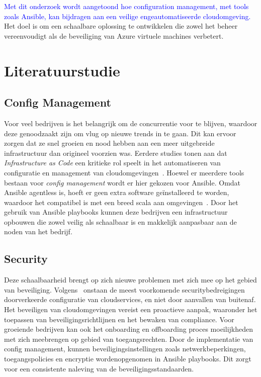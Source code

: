 \textcolor{blue}{Met dit onderzoek wordt aangetoond hoe configuration management, met tools zoals Ansible, kan bijdragen aan een veilige en\linebreak geautomatiseerde cloudomgeving.}
Het doel is om een schaalbare oplossing te ontwikkelen die zowel het beheer vereenvoudigt als de beveiliging van Azure virtuele machines verbetert.


\section{Literatuurstudie}%
\label{sec:literatuurstudie}

\subsection{Config Management}%

Voor veel bedrijven is het belangrijk om de concurrentie voor te blijven, waardoor deze genoodzaakt zijn om vlug op nieuwe trends in te gaan.
Dit kan ervoor zorgen dat ze snel groeien en nood hebben aan een meer uitgebreide infrastructuur dan origineel voorzien was.
Eerdere studies tonen aan dat \emph{Infrastructure as Code} een kritieke rol speelt in het automatiseren van configuratie en management van cloudomgevingen\linebreak~\autocite{Kalliomaa2024}.
Hoewel er meerdere tools bestaan voor \emph{config management} wordt er hier gekozen voor Ansible.
Omdat Ansible agentless is, hoeft er geen extra software geïnstalleerd te worden, waardoor het compatibel is met een breed scala aan omgevingen~\autocite{Elradi2023}.
Door het gebruik van Ansible playbooks kunnen deze bedrijven een infrastructuur opbouwen die zowel veilig als schaalbaar is en makkelijk aanpasbaar aan de noden van het bedrijf.

\subsection{Security}%

Deze schaalbaarheid brengt op zich nieuwe problemen met zich mee op het gebied van beveiliging.
Volgens~\textcite{Ots2021} onstaan de meest voorkomende securitybedreigingen door\linebreak verkeerde configuratie van cloudservices, en niet door aanvallen van buitenaf.
Het beveiligen van cloudomgevingen vereist een proactieve aanpak, waaronder het toepassen van beveiligingsrichtlijnen en het bewaken van compliance.
Voor groeiende bedrijven kan ook het onboarding en offboarding proces moeilijkheden met zich meebrengen op gebied van toegangsrechten.
Door de implementatie van config management, kunnen beveiligingsinstellingen zoals netwerkbeperkingen, toegangspolicies en encryptie worden\linebreak opgenomen in Ansible playbooks.
Dit zorgt voor een consistente naleving van de beveiligingsstandaarden.

